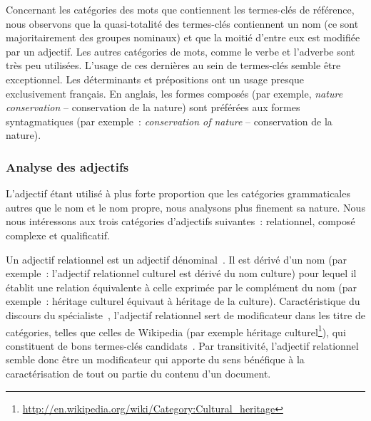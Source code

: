      Concernant les catégories des mots que contiennent les termes-clés de
      référence, nous observons que la quasi-totalité des termes-clés
      contiennent un nom (ce sont majoritairement des groupes nominaux) et
      que la moitié d'entre eux est modifiée par un adjectif. Les autres
      catégories de mots, comme le verbe et l'adverbe sont très peu utilisées.
      L'usage de ces dernières au sein de termes-clés semble être exceptionnel.
      Les déterminants et prépositions ont un usage presque exclusivement
      français. En anglais, les formes composés (par exemple,
      \textit{\og{}nature conservation\fg{}} -- \og{}conservation de la
      nature\fg{}) sont préférées aux formes syntagmatiques (par exemple~:
      \textit{\og{}conservation of nature\fg{}} -- \og{}conservation de la
      nature\fg{}).

      \subsubsection{Analyse des adjectifs}
      \label{subsubsec:main:domain_independent_keyphrase_extraction-keyphrase_candidate_selection-analysis_of_keyphrase_properties-adjective_analysis}
      L'adjectif étant utilisé à plus forte proportion que les catégories
      grammaticales autres que le nom et le nom propre, nous analysons plus
      finement sa nature. Nous nous intéressons aux trois catégories d'adjectifs
      suivantes~: relationnel, composé complexe et qualificatif.
      
      Un adjectif relationnel est un adjectif
      dénominal~\cite{bally1944linguistiquegeneraleetlinguistiquefrancaise}. Il
      est dérivé d'un nom (par exemple~: l'adjectif relationnel
      \og{}culturel\fg{} est dérivé du nom \og{}culture\fg{}) pour lequel il
      établit une relation équivalente à celle exprimée par le complément du nom
      (par exemple~: \og{}héritage culturel\fg{} équivaut à \og{}héritage de la
      culture\fg{}). Caractéristique du discours du
      spécialiste~\cite{maniez2009denominaladjectives}, l'adjectif relationnel
      sert de modificateur dans les titre de catégories, telles que celles de
      Wikipedia (par exemple \og{}héritage
      culturel\fg{}\footnote{\url{http://en.wikipedia.org/wiki/Category:Cultural_heritage}}),
      qui constituent de bons termes-clés
      candidats~\cite{medelyan2008smalltrainingset,eichler2010keywe}. Par
      transitivité, l'adjectif relationnel semble donc être un modificateur qui
      apporte du sens bénéfique à la caractérisation  de tout ou partie du
      contenu d'un document.
      
